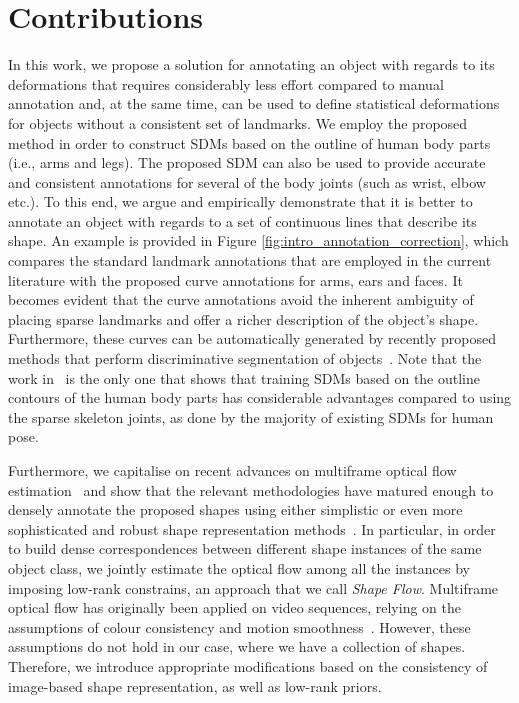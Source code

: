 \section{Contributions}

In this work, we propose a solution for annotating an object with regards to its deformations that requires considerably less effort compared to manual annotation and, at the same time, can be used to define statistical deformations for objects without a consistent set of landmarks. We employ the proposed method in order to construct SDMs based on the outline of human body parts (i.e., arms and legs). The proposed SDM can also be used to provide accurate and consistent annotations for several of the body joints (such as wrist, elbow etc.).
To this end, we argue and empirically demonstrate that it is better to annotate an object with regards to a set of continuous lines that describe its shape. An example is provided in Figure \ref{fig:intro_annotation_correction}, which compares the standard landmark annotations that are employed in the current literature with the proposed curve annotations for arms, ears and faces. It becomes evident that the curve annotations avoid the inherent ambiguity of placing sparse landmarks and offer a richer description of the object's shape.
%
Furthermore, these curves can be automatically generated by recently proposed methods that perform discriminative segmentation of objects~\cite{luo2013pedestrian,liu2015matching}.
%
Note that the work in~\cite{zuffi2012pictorial} is the only one that shows that training SDMs based on the outline contours of the human body parts has considerable advantages compared to using the sparse skeleton joints, as done by the majority of existing SDMs for human pose.

Furthermore, we capitalise on recent advances on multiframe optical flow estimation~\cite{Garg:2013hu,tomasi2012dense,snape15faceflow} and show that the relevant methodologies have matured enough to densely annotate the proposed shapes using either simplistic or even more sophisticated and robust shape representation methods~\cite{Nguyen2013}.
In particular, in order to build dense correspondences between different shape instances of the same object class, we jointly estimate the optical flow among all the instances by imposing low-rank constrains, an approach that we call \emph{Shape Flow}. Multiframe optical flow has originally been applied on video sequences, relying on the assumptions of colour consistency and motion smoothness~\cite{Garg:2013hu}. However, these assumptions do not hold in our case, where we have a collection of shapes. Therefore, we introduce appropriate modifications based on the consistency of image-based shape representation, as well as low-rank priors.



